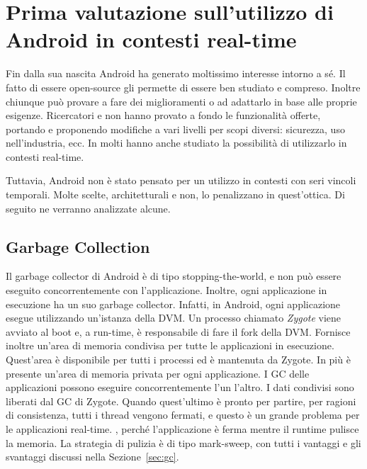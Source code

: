 \section{Prima valutazione sull'utilizzo di Android in contesti real-time}
Fin dalla sua nascita Android ha generato moltissimo interesse intorno a sé. Il fatto di essere open-source gli permette di essere ben studiato e compreso. Inoltre chiunque può provare a fare dei miglioramenti o ad adattarlo in base alle proprie esigenze. Ricercatori e non hanno provato a fondo le funzionalità offerte, portando e proponendo modifiche a vari livelli per scopi diversi: sicurezza, uso nell'industria, ecc. In molti hanno anche studiato la possibilità di utilizzarlo in contesti real-time. 

Tuttavia, Android non è stato pensato per un utilizzo in contesti con seri vincoli temporali. Molte scelte, architetturali e non, lo penalizzano in quest'ottica. Di seguito ne verranno analizzate alcune.

\subsection{Garbage Collection} \label{sec:gcandroid}
Il garbage collector di Android è di tipo stopping-the-world, e non può essere eseguito concorrentemente con l'applicazione. Inoltre, ogni applicazione in esecuzione ha un suo garbage collector. Infatti, in Android, ogni applicazione esegue utilizzando un'istanza della DVM. Un processo chiamato \textit{Zygote} viene avviato al boot e, a run-time, è responsabile di fare il fork della DVM. Fornisce inoltre un'area di memoria condivisa per tutte le applicazioni in esecuzione. Quest'area è disponibile per tutti i processi ed è mantenuta da Zygote. In più è presente un'area di memoria privata per ogni applicazione. I GC delle applicazioni possono eseguire concorrentemente l'un l'altro. I dati condivisi sono liberati dal GC di Zygote. Quando quest'ultimo è pronto per partire, per ragioni di consistenza, tutti i thread vengono fermati, e questo è un grande problema per le applicazioni real-time. , perché l'applicazione è ferma mentre il runtime pulisce la memoria. La strategia di pulizia è di tipo mark-sweep, con tutti i vantaggi e gli svantaggi discussi nella Sezione~\ref{sec:gc}.

